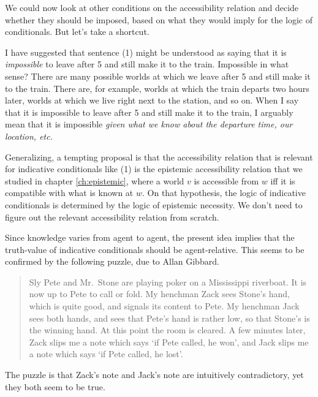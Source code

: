 
We could now look at other conditions on the accessibility relation and decide
whether they should be imposed, based on what they would imply for the logic of
conditionals. But let's take a shortcut.

I have suggested that sentence (1) might be understood as saying that it is
\emph{impossible} to leave after 5 and still make it to the train. Impossible in
what sense? There are many possible worlds at which we leave after 5 and still
make it to the train. There are, for example, worlds at which the train departs
two hours later, worlds at which we live right next to the station, and so on.
When I say that it is impossible to leave after 5 and still make it to the
train, I arguably mean that it is impossible \emph{given what we know about the
  departure time, our location, etc.}

Generalizing, a tempting proposal is that the accessibility relation that is
relevant for indicative conditionals like (1) is the epistemic accessibility
relation that we studied in chapter \ref{ch:epistemic}, where a world $v$ is
accessible from $w$ iff it is compatible with what is known at $w$. On that
hypothesis, the logic of indicative conditionals is determined by the logic
of epistemic necessity. We don't need to figure out the relevant accessibility
relation from scratch.

Since knowledge varies from agent to agent, the present idea implies that the
truth-value of indicative conditionals should be agent-relative. This seems to
be confirmed by the following puzzle, due to Allan Gibbard.
\begin{quote}
  Sly Pete and Mr.\ Stone are playing poker on a Mississippi riverboat. It is
  now up to Pete to call or fold. My henchman Zack sees Stone’s hand, which is
  quite good, and signals its content to Pete. My henchman Jack sees both hands,
  and sees that Pete's hand is rather low, so that Stone's is the winning hand.
  At this point the room is cleared. A few minutes later, Zack slips me a note
  which says `if Pete called, he won', and Jack slips me a note which says `if
  Pete called, he lost'. %
\end{quote}
The puzzle is that Zack's note and Jack's note are intuitively contradictory,
yet they both seem to be true.

